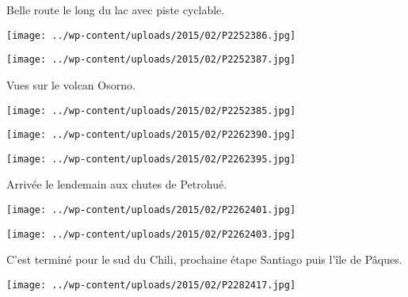  Belle route le long du lac avec piste cyclable. \newline
 \newline
\centerline{\texttt{[image: ../wp-content/uploads/2015/02/P2252386.jpg]} } 
 \newline
\centerline{\texttt{[image: ../wp-content/uploads/2015/02/P2252387.jpg]} } 
 \newline
 Vues sur le volcan Osorno. \newline
 \newline
\centerline{\texttt{[image: ../wp-content/uploads/2015/02/P2252385.jpg]} } 
 \newline
 \newline
\centerline{\texttt{[image: ../wp-content/uploads/2015/02/P2262390.jpg]} } 
 \newline
\centerline{\texttt{[image: ../wp-content/uploads/2015/02/P2262395.jpg]} } 
Arrivée le lendemain aux chutes de Petrohué. \newline
 \newline
\centerline{\texttt{[image: ../wp-content/uploads/2015/02/P2262401.jpg]} } 
 \newline
\centerline{\texttt{[image: ../wp-content/uploads/2015/02/P2262403.jpg]} } 
 \newline
 C'est terminé pour le sud du Chili, prochaine étape Santiago puis l'île de Pâques. \newline
 \newline
\centerline{\texttt{[image: ../wp-content/uploads/2015/02/P2282417.jpg]} } 
 \newline
  \newline
  \newline
  \newline
  \newline
  \newline
  \newline
  \newline
  \newline
  \newline
  \newline
  \newline
  \newline
  \newline
  \newline
  \newline

\newpage
 
